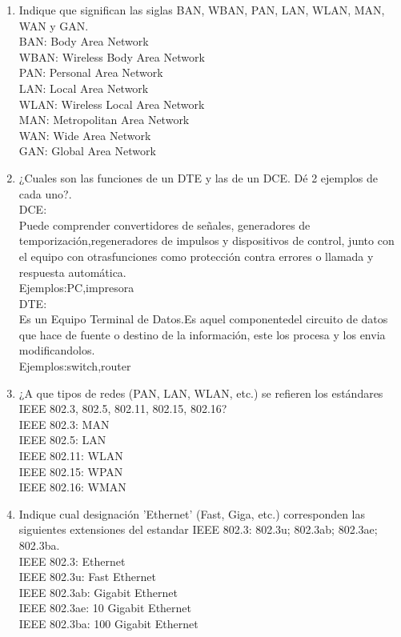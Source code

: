 \documentclass{udparticle}
\begin{document}
\begin{enumerate}
\item Indique que significan las siglas BAN, WBAN, PAN, LAN, WLAN, MAN, WAN y GAN.\\
    BAN: Body Area Network\\
    WBAN: Wireless Body Area Network\\
    PAN: Personal Area Network\\
    LAN: Local Area Network\\
    WLAN: Wireless Local Area Network\\
    MAN: Metropolitan Area Network\\
    WAN: Wide Area Network\\
    GAN: Global Area Network\\


\item ¿Cuales son las funciones de un DTE y las de un DCE. Dé 2 ejemplos de cada uno?.\\
    DCE:\\
        Puede comprender convertidores de señales, generadores de temporización,regeneradores de impulsos y dispositivos de control, 
        junto con el equipo con otrasfunciones como protección contra errores o llamada y respuesta automática.\\
        Ejemplos:PC,impresora\\
    DTE:\\
        Es un Equipo Terminal de Datos.Es aquel componentedel circuito de datos que hace de fuente o destino de la información,
        este los procesa y los envia modificandolos.\\
        Ejemplos:switch,router\\
        
\item ¿A que tipos de redes (PAN, LAN, WLAN, etc.) se refieren los estándares IEEE 802.3, 802.5,
802.11, 802.15, 802.16?\\
    IEEE 802.3: MAN\\
    IEEE 802.5: LAN\\
    IEEE 802.11: WLAN\\
    IEEE 802.15: WPAN\\
    IEEE 802.16: WMAN\\

\item Indique cual designación 'Ethernet' (Fast, Giga, etc.) corresponden las siguientes extensiones
del estandar IEEE 802.3: 802.3u; 802.3ab; 802.3ae; 802.3ba.\\
    IEEE 802.3: Ethernet\\
    IEEE   802.3u: Fast Ethernet\\
    IEEE  802.3ab: Gigabit Ethernet\\
    IEEE 802.3ae: 10 Gigabit Ethernet\\
    IEEE 802.3ba: 100 Gigabit Ethernet\\
    

\end{enumerate}
\end{document}
